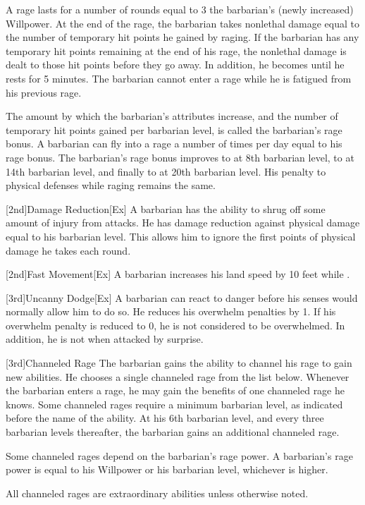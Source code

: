 A rage lasts for a number of rounds equal to 3 \add the barbarian's (newly increased) Willpower.
At the end of the rage, the barbarian takes nonlethal damage equal to the number of temporary hit points he gained by raging.
If the barbarian has any temporary hit points remaining at the end of his rage, the nonlethal damage is dealt to those hit points before they go away.
In addition, he becomes \fatigued until he rests for 5 minutes.
The barbarian cannot enter a rage while he is fatigued from his previous rage.

The amount by which the barbarian's attributes increase, and the number of temporary hit points gained per barbarian level, is called the barbarian's rage bonus.
A barbarian can fly into a rage a number of times per day equal to his rage bonus.
The barbarian's rage bonus improves to  at 8th barbarian level, to  at 14th barbarian level, and finally to  at 20th barbarian level.
His penalty to physical defenses while raging remains the same.

[2nd]{Damage Reduction}[Ex]
A barbarian has the ability to shrug off some amount of injury from attacks.
He has damage reduction against physical damage equal to his barbarian level.
This allows him to ignore the first points of physical damage he takes each round.

[2nd]{Fast Movement}[Ex]
A barbarian increases his land speed by 10 feet while \unencumbered.

[3rd]{Uncanny Dodge}[Ex]
A barbarian can react to danger before his senses would normally allow him to do so.
He reduces his overwhelm penalties by 1.
If his overwhelm penalty is reduced to 0, he is not considered to be overwhelmed.
In addition, he is not \unaware when attacked by surprise.

[3rd]{Channeled Rage}
The barbarian gains the ability to channel his rage to gain new abilities.
He chooses a single channeled rage from the list below.
Whenever the barbarian enters a rage, he may gain the benefits of one channeled rage he knows.
Some channeled rages require a minimum barbarian level, as indicated before the name of the ability.
At his 6th barbarian level, and every three barbarian levels thereafter, the barbarian gains an additional channeled rage.

Some channeled rages depend on the barbarian's rage power.
A barbarian's rage power is equal to his Willpower or his barbarian level, whichever is higher.

All channeled rages are extraordinary abilities unless otherwise noted.

